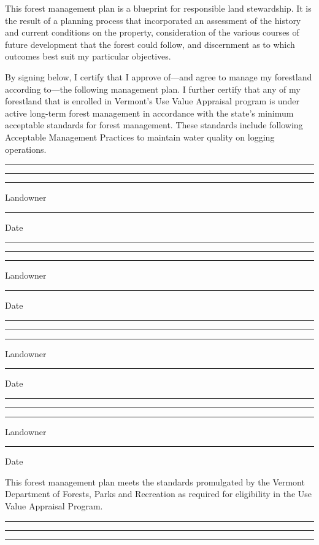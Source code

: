 \documentclass[]{tufte-handout}
\begin{document}
\vspace{30pt} \indent This forest management plan is a blueprint for
responsible land stewardship. It is the result of a planning process
that incorporated an assessment of the history and current conditions on
the property, consideration of the various courses of future development
that the forest could follow, and discernment as to which outcomes best
suit my particular objectives.

\vspace{5pt} By signing below, I certify that I approve of---and agree
to manage my forestland according to---the following management plan. I
further certify that any of my forestland that is enrolled in Vermont's
Use Value Appraisal program is under active long-term forest management
in accordance with the state's minimum acceptable standards for forest
management. These standards include following Acceptable Management
Practices to maintain water quality on logging operations.

\vspace{38pt}

\noindent\rule{9cm}{0.4pt} \rule{.3cm}{0pt} \rule{4cm}{0.4pt}

\noindent Landowner \rule{7.7cm}{0pt} Date

\vspace{18pt}

\noindent\rule{9cm}{0.4pt} \rule{.3cm}{0pt} \rule{4cm}{0.4pt}

\noindent Landowner \rule{7.7cm}{0pt} Date

\vspace{18pt}

\noindent\rule{9cm}{0.4pt} \rule{.3cm}{0pt} \rule{4cm}{0.4pt}

\noindent Landowner \rule{7.7cm}{0pt} Date

\vspace{18pt}

\noindent\rule{9cm}{0.4pt} \rule{.3cm}{0pt} \rule{4cm}{0.4pt}

\noindent Landowner \rule{7.7cm}{0pt} Date

\vspace{24pt}

This forest management plan meets the standards promulgated by the
Vermont Department of Forests, Parks and Recreation as required for
eligibility in the Use Value Appraisal Program.

\vspace{22pt}

\noindent\rule{9cm}{0.4pt} \rule{.3cm}{0pt} \rule{4cm}{0.4pt}
\end{document}
